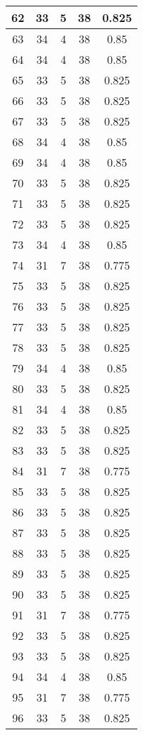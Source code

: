 \documentclass[letterpaper, 12pt]{article}
\begin{document}
\begin{longtable}{|c|c|c|c|c|}
\hline
62 & 33 & 5 & 38 & 0.825 \\
\hline
63 & 34 & 4 & 38 & 0.85 \\
\hline
64 & 34 & 4 & 38 & 0.85 \\
\hline
65 & 33 & 5 & 38 & 0.825 \\
\hline
66 & 33 & 5 & 38 & 0.825 \\
\hline
67 & 33 & 5 & 38 & 0.825 \\
\hline
68 & 34 & 4 & 38 & 0.85 \\
\hline
69 & 34 & 4 & 38 & 0.85 \\
\hline
70 & 33 & 5 & 38 & 0.825 \\
\hline
71 & 33 & 5 & 38 & 0.825 \\
\hline
72 & 33 & 5 & 38 & 0.825 \\
\hline
73 & 34 & 4 & 38 & 0.85 \\
\hline
74 & 31 & 7 & 38 & 0.775 \\
\hline
75 & 33 & 5 & 38 & 0.825 \\
\hline
76 & 33 & 5 & 38 & 0.825 \\
\hline
77 & 33 & 5 & 38 & 0.825 \\
\hline
78 & 33 & 5 & 38 & 0.825 \\
\hline
79 & 34 & 4 & 38 & 0.85 \\
\hline
80 & 33 & 5 & 38 & 0.825 \\
\hline
81 & 34 & 4 & 38 & 0.85 \\
\hline
82 & 33 & 5 & 38 & 0.825 \\
\hline
83 & 33 & 5 & 38 & 0.825 \\
\hline
84 & 31 & 7 & 38 & 0.775 \\
\hline
85 & 33 & 5 & 38 & 0.825 \\
\hline
86 & 33 & 5 & 38 & 0.825 \\
\hline
87 & 33 & 5 & 38 & 0.825 \\
\hline
88 & 33 & 5 & 38 & 0.825 \\
\hline
89 & 33 & 5 & 38 & 0.825 \\
\hline
90 & 33 & 5 & 38 & 0.825 \\
\hline
91 & 31 & 7 & 38 & 0.775 \\
\hline
92 & 33 & 5 & 38 & 0.825 \\
\hline
93 & 33 & 5 & 38 & 0.825 \\
\hline
94 & 34 & 4 & 38 & 0.85 \\
\hline
95 & 31 & 7 & 38 & 0.775 \\
\hline
96 & 33 & 5 & 38 & 0.825 \\

\end{longtable}
\end{document}
